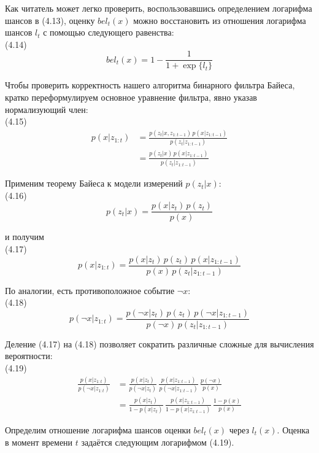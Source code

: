 \documentclass[10pt,a4paper]{article}
\begin{document}
Как читатель может легко проверить, воспользовавшись определением логарифма шансов в (4.13), оценку $bel_t(x)$ можно восстановить из отношения логарифма шансов $l_t$ с помощью следующего равенства:\\

(4.14)
$$bel_t(x)=1-\frac{1}{1+\exp\{l_t\}}$$

Чтобы проверить корректность нашего алгоритма бинарного фильтра Байеса, кратко переформулируем основное уравнение фильтра, явно указав нормализующий член:\\

(4.15)
\begin{equation*}
\begin{split}
p(x|z_{1:t})&=\frac{p(z_t|x,z_{1:t-1})\,p(x|z_{1:t-1})}{p(z_t|z_{1:t-1})}\\
&=\frac{p(z_t|x)\,p(x|z_{1:t-1})}{p(z_t|z_{1:t-1})}
\end{split}
\end{equation*}

Применим теорему Байеса к модели измерений $p(z_t|x)$:\\

(4.16)
$$p(z_t|x)=\frac{p(x|z_t)\,p(z_t)}{p(x)}$$

и получим\\

(4.17)
$$p(x|z_{1:t})=\frac{p(x|z_t)\,p(z_t)\,p(x|z_{1:t-1})}{p(x)\,p(z_t|z_{1:t-1})}$$

По аналогии, есть противоположное событие $\neg x$:\\

(4.18)
$$p(\neg x|z_{1:t})=\frac{p(\neg x|z_t)\,p(z_t)\,p(\neg x|z_{1:t-1})}{p(\neg x)\,p(z_t|z_{1:t-1})}$$

Деление (4.17) на (4.18) позволяет сократить различные сложные для вычисления вероятности:\\

(4.19)
\begin{equation*}
\begin{split}
\frac{p(x|z_{1:t})}{p(\neg x|z_{1:t})}&=\frac{p(x|z_t)}{p(\neg x|z_t)}\,\frac{p(x|z_{1:t-1})}{p(\neg x|z_{1:t-1})}\,\frac{p(\neg x)}{p(x)}\\
&=\frac{p(x|z_t)}{1-p(x|z_t)}\,\frac{p(x|z_{1:t-1})}{1-p(x|z_{1:t-1})}\,\frac{1-p(x)}{p(x)}
\end{split}
\end{equation*}

Определим отношение логарифма шансов оценки $bel_t(x)$ через $l_t(x)$. Оценка в момент времени $t$ задаётся следующим логарифмом (4.19).\\
\end{document}

